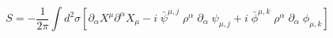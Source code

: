 \begin{equation}
S= -\frac{1}{2\pi}\int d^2\sigma\left [ \partial_{\alpha}X^{\mu}\partial^{\alpha}X_{\mu}
-i\; \bar{\psi}^{\mu,j}\;\rho^{\alpha}\;\partial_{\alpha}\;  \psi_{\mu,j}
+ i\; \bar{\phi}^{\mu,k}\;\rho^{\alpha}\;\partial_{\alpha}\;  \phi_{\mu,k}\right ]
\label{a}
\end{equation}

